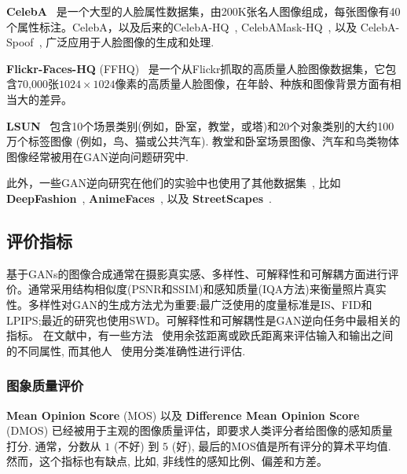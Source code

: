 \vspace{1mm}
\noindent\textbf{CelebA}~\cite{liu2015faceattributes} 是一个大型的人脸属性数据集，由200K张名人图像组成，每张图像有40个属性标注。CelebA，以及后来的CelebA-HQ~\cite{karras2017progressive}, CelebAMask-HQ~\cite{CelebAMask-HQ}, 以及 CelebA-Spoof~\cite{CelebA-Spoof}, 广泛应用于人脸图像的生成和处理.\par

\vspace{1mm}
\noindent\textbf{Flickr-Faces-HQ} (FFHQ)~\cite{karras2019style,karras2020analyzing} 是一个从Flickr抓取的高质量人脸图像数据集，它包含70,000张$1024 \times 1024$像素的高质量人脸图像，在年龄、种族和图像背景方面有相当大的差异。\par

\vspace{1mm}
\noindent\textbf{LSUN}~\cite{yu2015lsun} 包含10个场景类别(例如，卧室，教堂，或塔)和20个对象类别的大约100万个标签图像 (例如，鸟、猫或公共汽车).
教堂和卧室场景图像、汽车和鸟类物体图像经常被用在GAN逆向问题研究中.\par

此外，一些GAN逆向研究在他们的实验中也使用了其他数据集~\cite{lecun1998mnist,xiao2017fashion,krizhevsky2009learning,chen2014cross,yu2017jittor,xia2020tedigan}, 比如 \textbf{DeepFashion}~\cite{liu2016fashion, liu2016deepfashion, Ge2019DeepFashion2}, \textbf{AnimeFaces}~\cite{jin2017towards}, 以及 \textbf{StreetScapes}~\cite{naik2014streetscore}.

\subsection{评价指标}
\label{sec:metrics}

基于GANs的图像合成通常在摄影真实感、多样性、可解释性和可解耦方面进行评价。通常采用结构相似度(PSNR和SSIM)和感知质量(IQA方法)来衡量照片真实性。多样性对GAN的生成方法尤为重要;最广泛使用的度量标准是IS、FID和LPIPS;最近的研究也使用SWD。可解释性和可解耦性是GAN逆向任务中最相关的指标。
在文献中，有一些方法~\cite{nitzan2020harness} 使用余弦距离或欧氏距离来评估输入和输出之间的不同属性, 而其他人~\cite{voynov2020latent} 使用分类准确性进行评估.

\subsubsection{图象质量评价}
\label{sec:iqa}

\noindent\textbf{Mean Opinion Score} (MOS) 以及 \textbf{Difference Mean Opinion Score} (DMOS) 已经被用于主观的图像质量评估，即要求人类评分者给图像的感知质量打分.
通常，分数从 $1$ (不好) 到 $5$ (好), 最后的MOS值是所有评分的算术平均值.
然而，这个指标也有缺点, 比如, 非线性的感知比例、偏差和方差。



